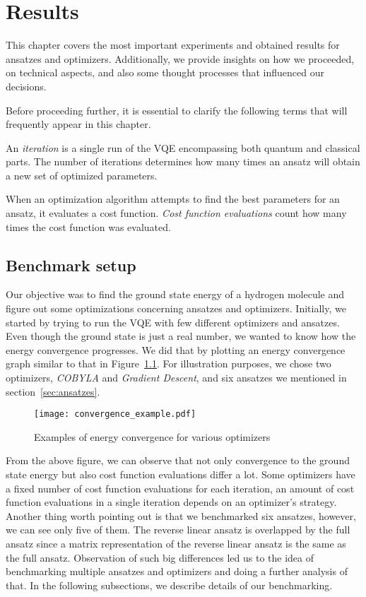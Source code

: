 \chapter{Results}\label{ch:results}
This chapter covers the most important experiments and obtained results for ansatzes and optimizers. Additionally, we provide insights on how we proceeded, on technical aspects, and also some thought processes that influenced our decisions.

Before proceeding further, it is essential to clarify the following terms that will frequently appear in this chapter.

An \textit{iteration} is a single run of the VQE encompassing both quantum and classical parts. The number of iterations determines how many times an ansatz will obtain a new set of optimized parameters.

When an optimization algorithm attempts to find the best parameters for an ansatz, it evaluates a cost function. \textit{Cost function evaluations} count how many times the cost function was evaluated.

\section{Benchmark setup}
Our objective was to find the ground state energy of a hydrogen molecule and figure out some optimizations concerning ansatzes and optimizers. Initially, we started by trying to run the VQE with few different optimizers and ansatzes. Even though the ground state is just a real number, we wanted to know how the energy convergence progresses. We did that by plotting an energy convergence graph similar to that in Figure~\ref{fig:energy-convergence}. For illustration purposes, we chose two optimizers, \textit{COBYLA} and \textit{Gradient Descent}, and six ansatzes we mentioned in section~\ref{sec:ansatzes}.
\begin{figure}[H]
    \centering
    \texttt{[image: convergence\_example.pdf]}
    \caption{Examples of energy convergence for various optimizers}
    \label{fig:energy-convergence}
\end{figure}
From the above figure, we can observe that not only convergence to the ground state energy but also cost function evaluations differ a lot. Some optimizers have a fixed number of cost function evaluations for each iteration, an amount of cost function evaluations in a single iteration depends on an optimizer's strategy. Another thing worth pointing out is that we benchmarked six ansatzes, however, we can see only five of them. The reverse linear ansatz is overlapped by the full ansatz since a matrix representation of the reverse linear ansatz is the same as the full ansatz. Observation of such big differences led us to the idea of benchmarking multiple ansatzes and optimizers and doing a further analysis of that. In the following subsections, we describe details of our benchmarking.

